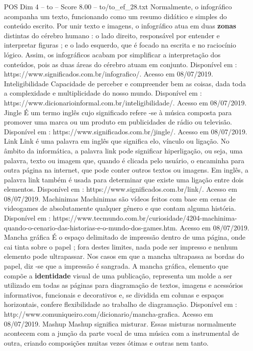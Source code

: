 \begin{textsample}{POS Dim 4 – to – Score 8.00 – to/to\_ef\_28.txt}
Normalmente, o infográfico acompanha um texto, funcionando como um resumo didático e simples do conteúdo escrito.
Por unir texto e imagens, o infográfico atua em duas \textbf{zonas} distintas do cérebro humano : o lado direito, responsável por entender e interpretar figuras ; e o lado esquerdo, que é focado na escrita e no raciocínio lógico.
Assim, os infográficos acabam por simplificar a interpretação dos conteúdos, pois as duas áreas do cérebro atuam em conjunto.
Disponível em : https://www.significados.com.br/infografico/.
Acesso em 08/07/2019.
Inteligibilidade Capacidade de perceber e compreender bem as coisas, dada toda a complexidade e multiplicidade do nosso mundo.
Disponível em : https://www.dicionarioinformal.com.br/inteligibilidade/.
Acesso em 08/07/2019.
Jingle É um termo inglês cujo significado refere -se à música composta para promover uma marca ou um produto em publicidades de rádio ou televisão.
Disponível em : https://www.significados.com.br/jingle/.
Acesso em 08/07/2019.
Link Link é uma palavra em inglês que significa elo, vínculo ou ligação.
No âmbito da informática, a palavra link pode significar hiperligação, ou seja, uma palavra, texto ou imagem que, quando é clicada pelo usuário, o encaminha para outra página na internet, que pode conter outros textos ou imagens.
Em inglês, a palavra link também é usada para determinar que existe uma ligação entre dois elementos.
Disponível em : https://www.significados.com.br/link/.
Acesso em 08/07/2019.
Machinimas Machinimas são vídeos feitos com base em cenas de videogames de absolutamente qualquer gênero e que contam alguma história.
Disponível em : https://www.tecmundo.com.br/curiosidade/4204-machinima-quando-o-cenario-das-historias-e-o-mundo-dos-games.htm.
Acesso em 08/07/2019.
Mancha gráfica É o espaço delimitado de impressão dentro de uma página, onde cai tinta sobre o papel ; fora destes limites, nada pode ser impresso e nenhum elemento pode ultrapassar.
Nos casos em que a mancha ultrapassa as bordas do papel, diz -se que a impressão é sangrada.
A mancha gráfica, elemento que compõe a \textbf{identidade} visual de uma publicação, representa um molde a ser utilizado em todas as páginas para diagramação de textos, imagens e acessórios informativos, funcionais e decorativos e, se dividida em colunas e espaços horizontais, confere flexibilidade ao trabalho de diagramação.
Disponível em : http://www.comuniqueiro.com/dicionario/mancha-grafica.
Acesso em 08/07/2019.
Mashup Mashup significa misturar.
Essas misturas normalmente acontecem com a junção da parte vocal de uma música com a instrumental de outra, criando composições muitas vezes ótimas e outras nem tanto.

\end{textsample}
